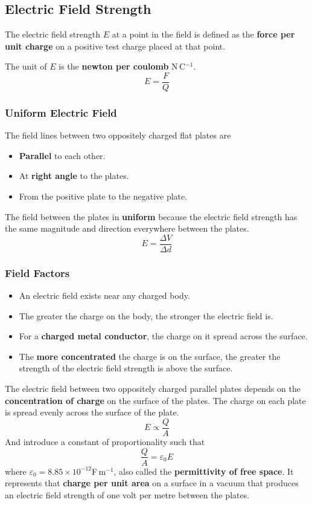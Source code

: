 \subsection{Electric Field Strength}

The electric field strength $E$ at a point in the field is defined as the \textbf{force per unit charge} on a positive test charge placed at that point.

The unit of $E$ is the \textbf{newton per coulomb} N\,C$^{-1}$.
$$E=\frac{F}{Q}$$

\subsubsection*{Uniform Electric Field}
The field lines between two oppositely charged flat plates are
\begin{itemize}
    \item \textbf{Parallel} to each other.
    \item At \textbf{right angle} to the plates.
    \item From the positive plate to the negative plate.
\end{itemize}

The field between the plates in \textbf{uniform} because the electric field strength has the same magnitude and direction everywhere between the plates.
$$E=\frac{\Delta V}{\Delta d}$$

\subsubsection*{Field Factors}

\begin{itemize}
    \item An electric field exists near any charged body.
    \item The greater the charge on the body, the stronger the electric field is.
    \item For a \textbf{charged metal conductor}, the charge on it spread across the surface.
    \item The \textbf{more concentrated} the charge is on the surface, the greater the strength of the electric field strength is above the surface.
\end{itemize}

The electric field between two oppositely charged parallel plates depends on the \textbf{concentration of charge} on the surface of the plates. The charge on each plate is spread evenly across the surface of the plate.
$$E\propto\frac{Q}{A}$$
And introduce a constant of proportionality such that
$$\frac{Q}{A}=\varepsilon_0E$$
where $\varepsilon_0=8.85\times10^{-12}$F\,m$^{-1}$, also called the \textbf{permittivity of free space}. It represents that \textbf{charge per unit area} on a surface in a vacuum that produces an electric field strength of one volt per metre between the plates.
